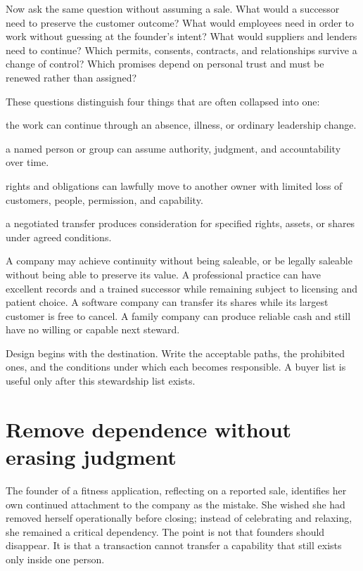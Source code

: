 Now ask the same question without assuming a sale. What would a successor need
to preserve the customer outcome? What would employees need in order to work
without guessing at the founder's intent? What would suppliers and lenders need
to continue? Which permits, consents, contracts, and relationships survive a
change of control? Which promises depend on personal trust and must be renewed
rather than assigned?

These questions distinguish four things that are often collapsed into one:

\begin{description}[leftmargin=0em,style=unboxed,itemsep=0.1em,
  topsep=0.2em,parsep=0em,labelsep=0.55em]
\item[Continuity] the work can continue through an absence, illness, or ordinary
  leadership change.
\item[Succession] a named person or group can assume authority, judgment, and
  accountability over time.
\item[Transfer] rights and obligations can lawfully move to another owner with
  limited loss of customers, people, permission, and capability.
\item[Sale] a negotiated transfer produces consideration for specified rights,
  assets, or shares under agreed conditions.
\end{description}

A company may achieve continuity without being saleable, or be legally
saleable without being able to preserve its value. A professional practice can
have excellent records and a trained successor while remaining subject to
licensing and patient choice. A software company can transfer its shares while
its largest customer is free to cancel. A family company can produce reliable
cash and still have no willing or capable next steward.

Design begins with the destination. Write the acceptable paths, the prohibited
ones, and the conditions under which each becomes responsible. A buyer list is
useful only after this stewardship list exists.

\section{Remove dependence without erasing judgment}

The founder of a fitness application, reflecting on a reported sale, identifies
her own continued attachment to the company as the mistake. She wished she had
removed herself operationally before closing; instead of celebrating and
relaxing, she remained a critical dependency. The point is not that founders
should disappear. It is that a transaction cannot transfer a capability that
still exists only inside one person.

